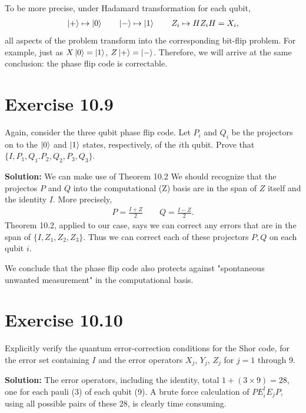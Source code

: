 \documentclass{book}
\begin{document}
    To be more precise, under Hadamard transformation for each qubit,
    \begin{align}
        \ket{+} \mapsto \ket{0} \qquad \ket{-} \mapsto \ket{1} \qquad Z_i \mapsto H Z_i H = X_i,
    \end{align}
    all aspects of the problem transform into the corresponding bit-flip problem. For example, just as $X\ket{0} = \ket{1}$, $Z \ket{+} = \ket{-}$. Therefore, we will arrive at the same conclusion: the phase flip code is correctable.

\section*{Exercise 10.9}
    Again, consider the three qubit phase flip code. Let $P_i$ and $Q_i$ be the projectors on to the $\ket{0}$ and $\ket{1}$ states, respectively, of the $i$th qubit. Prove that $\{I, P_1, Q_1. P_2, Q_2, P_3, Q_3\}$.

    \textbf{Solution:} We can make use of Theorem 10.2 We should recognize that the projectos $P$ and $Q$ into the computational (Z) basis are in the span of $Z$ itself and the identity $I$. More precisely,
    \begin{align}
        P = \frac{I + Z}{2} \qquad
        Q = \frac{I - Z}{2}.
    \end{align}
    Theorem 10.2, applied to our case, says we can correct any errors that are in the span of $\{I, Z_1, Z_2, Z_3\}$. Thus we can correct each of these projectors $P, Q$ on each qubit $i$. 

    We conclude that the phase flip code also protects against "spontaneous unwanted measurement" in the computational basis. 

\section*{Exercise 10.10}
    Explicitly verify the quantum error-correction conditions for the Shor code, for the error set containing $I$ and the error operators $X_j$, $Y_j$, $Z_j$ for $j = 1$ through 9. 

    \textbf{Solution:} The error operators, including the identity, total $1 + (3\times 9) = 28$, one for each pauli (3) of each qubit (9). A brute force calculation of $P E_i^\dagger E_j P$, using all possible pairs of these 28, is clearly time consuming. 
    
\end{document}
